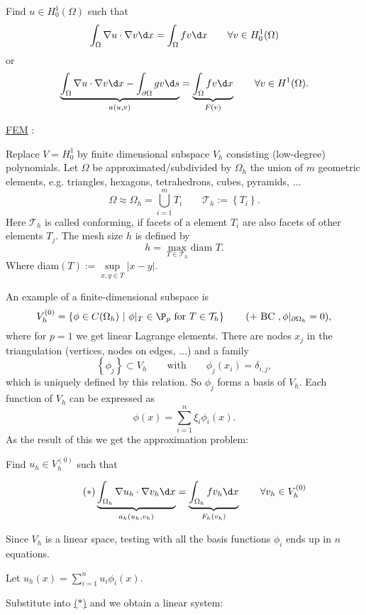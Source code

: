 Find $u \in H_{0}^{1}(\Omega)$ such that
\[
	\int_{\Omega} \nabla u \cdot \nabla v \d x = \int_{\Omega} fv \d x \qquad \forall v \in H_{0}^{1}(\Omega )
\] 
or
\[
	\underbrace{ \int_{\Omega }\nabla u \cdot \nabla v \d x - \int_{\partial \Omega }gv \d s}_{a(u,v)} = \underbrace{ \int_{\Omega }fv \d x}_{F(v)} \qquad \forall v \in H^{1}(\Omega )
.\] 

\underline{FEM} :

Replace $V=H_{0}^{1}$ by finite dimensional subspace $V_{h}$ consisting (low-degree) polynomials.
Let $\Omega $ be approximated/subdivided by $\Omega _{h}$ the union of $m$ geometric elements, e.g. triangles, hexagons, tetrahedrons, cubes, pyramids, $\ldots $
\[
\Omega \approx \Omega _{h} = \bigcup_{i=1}^{m}T_{i} \qquad \mathcal{T}_{h} := \left\{ T_{i} \right\} 
.\] 
Here $\mathcal{T}_{h}$ is called conforming, if facets of a element $T_{i}$ are also facets of other elements $T_{j}$.
The mesh size $h$ is defined by
\[
h = \max\limits_{T \in\mathcal{T}_{h}} \text{diam } T
.\] 
Where diam$(T):=\underset{x,y \in T }{\sup} |x-y|$.

An example of a finite-dimensional subspace is
\[
	V_{h}^{(0)} = \left\{ \phi \in C(\Omega _{h})\ |\ \phi|_{T} \in \P_{p} \text{ for } T \in \mathcal{T}_{h} \right\} \qquad (+ \text{ BC }, \phi|_{\partial \Omega _{h}}=0)
,\] 
where for $p=1$ we get linear Lagrange elements.
There are nodes $x_{j}$ in the triangulation (vertices, nodes on edges, $\ldots $) and a family
\[
	\left\{ \phi_{j} \right\} \subset V_{h} \qquad \text{with}\qquad \phi_{j}(x_{i}) = \delta_{i,j}
,\] 
which is uniquely defined by this relation.
So $\phi_{j}$ forms a basis of $V_{h}$.
Each function of $V_{h}$ can be expressed as
\[
	\phi(x) = \sum_{i=1}^{n}{\xi _{i}\phi_{i}(x)}
.\] 
As the result of this we get the approximation problem:

Find $u_{h} \in V_{h}^{(0)}$ such that

\begin{equation}\label{eq:discreteproblem}\tag{$\ast$}
	\underbrace{\int_{\Omega _{h}}\nabla u_{h}\cdot \nabla v_{h} \d x}_{a_{h}(u_{h},v_{h})} 
	=
	\underbrace{\int_{\Omega _{h}}f v_{h} \d x}_{F_{h}(v_{h})}  \qquad \forall v_{h} \in V_{h}^{(0)}
\end{equation}

Since $V_{h}$ is a linear space, testing with all the basis functions $\phi _{i}$ ends up in $n$ equations.

Let $u_{h}(x) = \sum_{i=1}^{n}{u_{i}\phi _{i}(x)}$.

Substitute into \href{eq:discreteproblem}{($\ast$)} and we obtain a linear system:

